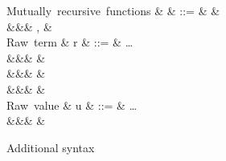 \begin{figure}
\begin{syntaxfig}
\mbox{Mutually recursive functions}
&
\delta
&
::=
&
\seqEmpty
&
\\
&&&
, \delta
&
\\[2mm]
\mbox{Raw term}
&
r
&
::=
&
\ldots
\\
&&&
\exLambda{\sigma}
&
\\
&&&
&
\\
&&&
&
\\[2mm]
\mbox{Raw value}
&
u
&
::=
&
\ldots
\\
&&&
\exClosure{\rho}{\delta}{\sigma}
&
\end{syntaxfig}
\caption{Additional syntax}
\end{figure}
